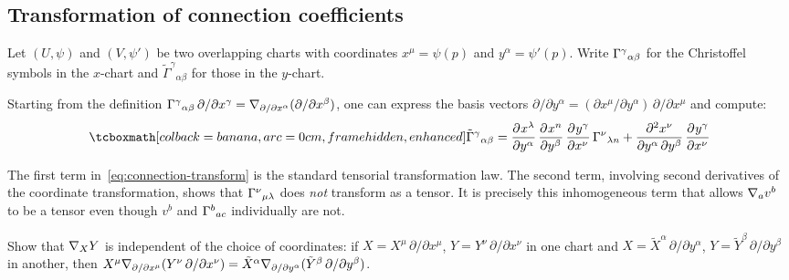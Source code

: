 \subsection{Transformation of connection coefficients}%
\label{sec:connection-transform}

Let $(U,\psi)$ and $(V,\psi')$ be two overlapping charts with
coordinates $x^\mu = \psi(p)$ and $y^\alpha = \psi'(p)$.
Write $\Gamma^{\gamma}{}_{\alpha\beta}$ for the Christoffel symbols
in the $x$-chart and $\tilde\Gamma^\gamma{}_{\alpha\beta}$ for
those in the $y$-chart.

Starting from the definition
$\Gamma^{\gamma}{}_{\alpha\beta}\,\partial/\partial x^\gamma
  = \nabla_{\partial/\partial x^\alpha}
    (\partial/\partial x^\beta)$,
one can express the basis vectors
$\partial/\partial y^\alpha
  = (\partial x^\mu/\partial y^\alpha)\,
    \partial/\partial x^\mu$
and compute:
\begin{equation}\label{eq:connection-transform}
  \eqbox{\tilde\Gamma^\gamma{}_{\alpha\beta}
    = \pd{x^\lambda}{y^\alpha}\,
      \pd{x^n}{y^\beta}\,
      \pd{y^\gamma}{x^\nu}\,
      \chris{\nu}{\lambda n}
    + \frac{\partial^2 x^\nu}{\partial y^\alpha\,
        \partial y^\beta}\,
      \pd{y^\gamma}{x^\nu}}
\end{equation}

\begin{remark}
  The first term in~\eqref{eq:connection-transform} is the
  standard tensorial transformation law.  The second term,
  involving second derivatives of the coordinate
  transformation, shows that $\Gamma^{\nu}{}_{\mu\lambda}$ does
  \emph{not} transform as a tensor.  It is precisely this
  inhomogeneous term that allows $\nabla_a v^b$ to be a tensor
  even though $v^b$ and $\Gamma^{b}{}_{ac}$ individually are not.
\end{remark}

\begin{exercise}\label{ex:covd-invariance}
  Show that $\nabla_X Y$ is independent of the choice of
  coordinates: if $X = X^\mu\,\partial/\partial x^\mu$,
  $Y = Y^\nu\,\partial/\partial x^\nu$ in one chart and
  $X = \tilde X^\alpha\,\partial/\partial y^\alpha$,
  $Y = \tilde Y^\beta\,\partial/\partial y^\beta$ in another,
  then $X^\mu \nabla_{\partial/\partial x^\mu}
    (Y^\nu\,\partial/\partial x^\nu)
  = \tilde X^\alpha \nabla_{\partial/\partial y^\alpha}
    (\tilde Y^\beta\,\partial/\partial y^\beta)$.
\end{exercise}

